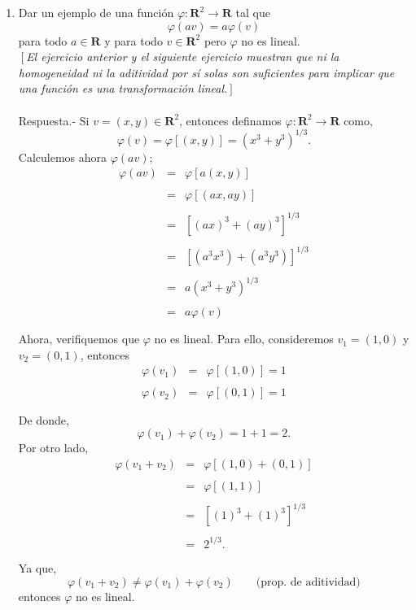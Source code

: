 \begin{enumerate}[\bfseries 1.]
    \item Dar un ejemplo de una función $\varphi:\textbf{R}^2\to \textbf{R}$ tal que
    $$\varphi(av)=a\varphi(v)$$
    para todo $a\in \textbf{R}$ y para todo $v\in \textbf{R}^2$ pero $\varphi$ no es lineal.\\
    $\left[\right.$\textit{El ejercicio anterior y el siguiente ejercicio muestran que ni la homogeneidad ni la aditividad por sí solas son suficientes para implicar que una función es una transformación lineal.}$\left.\right]$\\\\
	Respuesta.-\; Si $v=(x,y)\in \textbf{R}^2$, entonces definamos $\varphi:\textbf{R}^2\to \textbf{R}$ como,
	$$\varphi(v)=\varphi\left[(x,y)\right]=(x^3+y^3)^{1/3}.$$
	Calculemos ahora $\varphi(av)$;
	$$
	\begin{array}{rcl}
	    \varphi(av) &=& \varphi\left[a(x,y)\right]\\\\
			&=& \varphi\left[(ax,ay)\right]\\\\
			&=& \left[(ax)^3+(ay)^3\right]^{1/3}\\\\
			&=& \left[(a^3x^3)+(a^3y^3)\right]^{1/3}\\\\
			&=& a\left(x^3+y^3\right)^{1/3}\\\\
			&=& a\varphi\left(v\right)\\\\
	\end{array}
	$$
	Ahora, verifiquemos que $\varphi$ no es lineal. Para ello, consideremos $v_1=(1,0)$ y $v_2=(0,1)$, entonces
	$$
	\begin{array}{rcl}
	    \varphi(v_1)&=&\varphi\left[(1,0)\right]=1\\\\
	    \varphi(v_2)&=&\varphi\left[(0,1)\right]=1\\\\
	\end{array}
	$$
	De donde,
	$$\varphi(v_1)+\varphi(v_2)=1+1=2.$$
	Por otro lado,
	$$
	\begin{array}{rcl}
	    \varphi\left(v_1+v_2\right) &=& \varphi\left[(1,0)+(0,1)\right]\\\\
		    &=& \varphi\left[(1,1)\right]\\\\
		    &=& \left[(1)^3+(1)^3\right]^{1/3}\\\\
		    &=& 2^{1/3}.\\\\
	\end{array}
	$$
	Ya que, 
	$$\varphi\left(v_1+v_2\right)\neq \varphi\left(v_1\right)+\varphi\left(v_2\right) \qquad \mbox{(prop. de aditividad)}$$
	entonces $\varphi$ no es lineal.\\\\



\end{enumerate}
